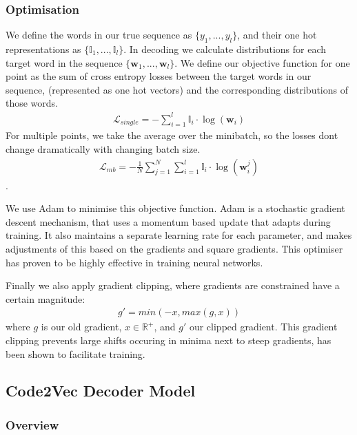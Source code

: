 \subsubsection{Optimisation}

We define the words in our true sequence as $\{y_1, ..., y_l\}$, and their one hot representations as $\{\mathbb{I}_1, ...,\mathbb{I}_l \}$.
In decoding we calculate distributions for each target word in the sequence $\{\mathbf{w}_1, ..., \mathbf{w}_l\}$.
We define our objective function for one point as the sum of cross entropy losses between the target words in our sequence, (represented as one hot vectors) and the corresponding distributions of those words.
\begin{align}
    \mathcal{L}_{single} = -\sum_{i=1}^l\mathbb{I}_i\cdotp\log(\mathbf{w}_i)
\end{align} 
For multiple points, we take the average over the minibatch, so the losses dont change dramatically with changing batch size.
\begin{align}
    \mathcal{L}_{mb} = -\frac{1}{N}\sum_{j=1}^N\sum_{i=1}^l\mathbb{I}_i\cdotp\log(\mathbf{w}_i^j)
\end{align}.

We use Adam \cite{kingma2014adam} to minimise this objective function. Adam is a stochastic gradient descent mechanism, that uses a momentum based update that adapts during training. It also maintains a separate learning rate for each parameter, and makes adjustments of this based on the gradients and square gradients. This optimiser has proven to be highly effective in training neural networks\cite{ruder_overview_2016}.

Finally we also apply gradient clipping, where gradients are constrained have a certain magnitude:
\begin{align}
     g' = min(-x,max(g, x))
\end{align}
where $g$ is our old gradient, $x \in \mathbb{R}^{+}$, and $g'$ our clipped gradient. This gradient clipping prevents large shifts occuring in minima next to steep gradients, has been shown to facilitate training\cite{pascanu_difficulty_2012}.

\subsection{Code2Vec Decoder Model} %
\label{sec:code2vec_decoder_model}

\subsubsection{Overview}

